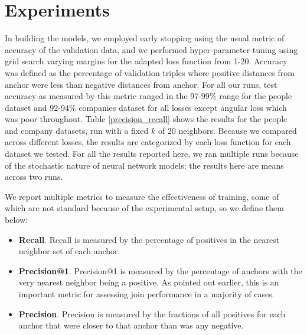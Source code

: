\section{Experiments}
\label{results}
In building the models, we employed early stopping using the usual metric of accuracy of the validation data, and we performed hyper-parameter tuning using grid search varying margins for the adapted loss function from 1-20.  Accuracy was defined as the percentage of validation triples where positive distances from anchor were less than negative distances from anchor.  For all our runs, test accuracy as measured by this metric ranged in the 97-99\% range for the people dataset and 92-94\% companies dataset for all losses except angular loss which was poor throughout.  Table \ref{precision_recall} shows the results for the people and company datasets, run with a fixed $k$ of 20 neighbors.  Because we compared across different losses, the results are categorized by each loss function for each dataset we tested.  For all the results reported here, we ran multiple runs because of the stochastic nature of neural network models; the results here are means across two runs. 

We report multiple metrics to measure the effectiveness of training, some of which are not standard because of the experimental setup, so we define them below:
\begin{itemize}
\item \textbf{Recall}.  Recall is measured by the percentage of positives in the nearest neighbor set of each anchor.
\item \textbf{Precision@1}.  Precision@1 is measured by the percentage of anchors with the very nearest neighbor being a positive.  As pointed out earlier, this is an important metric for assessing join performance in a majority of cases.
\item \textbf{Precision}.  Precision is measured by the fractions of all positives for each anchor that were closer to that anchor than was any negative.
\end{itemize}
 
